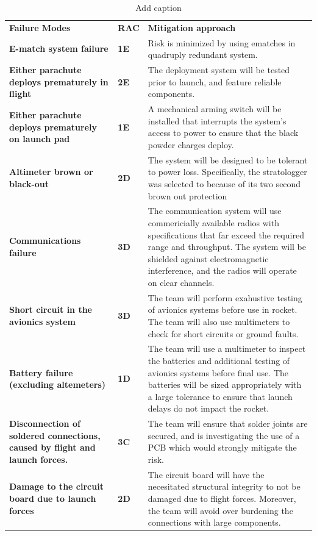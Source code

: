   \begin{table}[htbp]
    \centering
    \caption{Add caption}
    \begin{tabularx}{\linewidth}{X l X}
  \cmidrule{1-1}\cmidrule{3-3}    \rowcolor[rgb]{ 1,  0,  0} {\textcolor[rgb]{ 1,  1,  1}{\textbf{Failure Modes}}} &{\textcolor[rgb]{ 1,  1,  1}{\textbf{RAC}}} & \textcolor[rgb]{ 1,  1,  1}{\textbf{Mitigation approach}} \\
  \cmidrule{2-3}    \textbf{E-match system failure} & \textbf{1E} & Risk is minimized by using ematches in quadruply redundant system. \\
      \midrule
      \rowcolor[rgb]{ 1,  .882,  .8} \textbf{Either parachute deploys prematurely in flight} & \textbf{2E} & The deployment system will be tested prior to launch, and feature reliable components.  \\
      \midrule
      \textbf{Either parachute deploys prematurely on launch pad} & \textbf{1E} & A mechanical arming switch will be installed that interrupts the system's access to power to ensure that the black powder charges deploy.  \\
      \midrule
      \rowcolor[rgb]{ 1,  .882,  .8} \textbf{Altimeter brown or black-out} & \textbf{2D} & The system will be designed to be tolerant to power loss. Specifically, the stratologger was selected to because of its two second brown out protection \\
      \midrule
      \textbf{Communications failure} & \textbf{3D} & The communication system will use commericially available radios with specifications that far exceed the required range and throughput. The system will be shielded against electromagnetic interference, and the radios will operate on clear channels. \\
      \midrule
      \rowcolor[rgb]{ 1,  .882,  .8} \textbf{Short circuit in the avionics system} & \textbf{3D} & The team will perform exahustive testing of avionics systems before use in rocket. The team will also use multimeters to check for short circuits or ground faults.  \\
      \midrule
      \textbf{Battery failure (excluding altemeters)} & \textbf{1D} & The team will use a multimeter to inspect the batteries and additional testing of avionics systems before final use. The batteries will be sized appropriately with a large tolerance to ensure that launch delays do not impact the rocket. \\
      \midrule
      \rowcolor[rgb]{ 1,  .882,  .8} \textbf{Disconnection of soldered connections, caused by flight and launch forces.} & \textbf{3C} & The team will ensure that solder joints are secured, and is investigating the use of a PCB which would strongly mitigate the risk. \\
      \midrule
      \textbf{Damage to the circuit board due to launch forces} & \textbf{2D} & The circuit board will have the necesitated structural integrity to not be damaged due to flight forces. Moreover, the team will avoid over burdening the connections with large components. \\
      \bottomrule
      \end{tabularx}%
    \label{tab:addlabel}%
  \end{table}%
  

  

